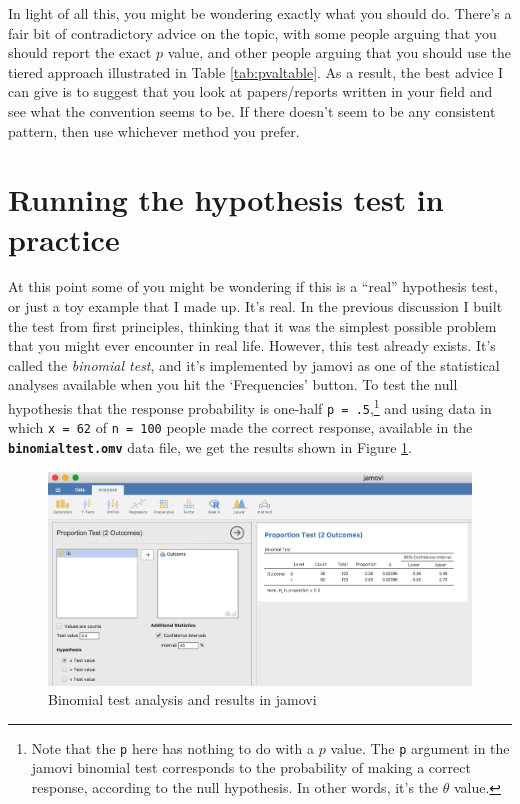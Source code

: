 \documentclass[
]{book}
\begin{document}
In light of all this, you might be wondering exactly what you should do. There's a fair bit of contradictory advice on the topic, with some people arguing that you should report the exact \(p\) value, and other people arguing that you should use the tiered approach illustrated in Table \ref{tab:pvaltable}. As a result, the best advice I can give is to suggest that you look at papers/reports written in your field and see what the convention seems to be. If there doesn't seem to be any consistent pattern, then use whichever method you prefer.

\hypertarget{runhyp}{%
\section{Running the hypothesis test in practice}\label{runhyp}}

At this point some of you might be wondering if this is a ``real'' hypothesis test, or just a toy example that I made up. It's real. In the previous discussion I built the test from first principles, thinking that it was the simplest possible problem that you might ever encounter in real life. However, this test already exists. It's called the \emph{binomial test}, and it's implemented by jamovi as one of the statistical analyses available when you hit the `Frequencies' button. To test the null hypothesis that the response probability is one-half \texttt{p\ =\ .5},\footnote{Note that the \texttt{p} here has nothing to do with a \(p\) value. The \texttt{p} argument in the jamovi binomial test corresponds to the probability of making a correct response, according to the null hypothesis. In other words, it's the \(\theta\) value.} and using data in which \texttt{x\ =\ 62} of \texttt{n\ =\ 100} people made the correct response, available in the \textbf{\texttt{binomialtest.omv}} data file, we get the results shown in Figure \ref{fig:binomialtest}.

\begin{figure}

{\centering \includegraphics[width=1\linewidth]{img/nhst/binomialtest} 

}

\caption{Binomial test analysis and results in jamovi}\label{fig:binomialtest}
\end{figure}
\end{document}
